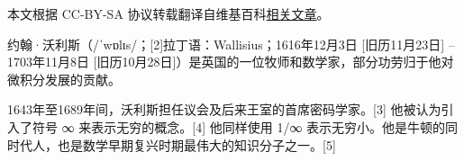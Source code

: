 
本文根据 CC-BY-SA 协议转载翻译自维基百科\href{https://en.wikipedia.org/wiki/John_Wallis}{相关文章}。


约翰·沃利斯（/ˈwɒlɪs/；[2]拉丁语：Wallisius；1616年12月3日 [旧历11月23日] – 1703年11月8日 [旧历10月28日]）是英国的一位牧师和数学家，部分功劳归于他对微积分发展的贡献。

1643年至1689年间，沃利斯担任议会及后来王室的首席密码学家。[3] 他被认为引入了符号 ∞ 来表示无穷的概念。[4] 他同样使用 1/∞ 表示无穷小。他是牛顿的同时代人，也是数学早期复兴时期最伟大的知识分子之一。[5]